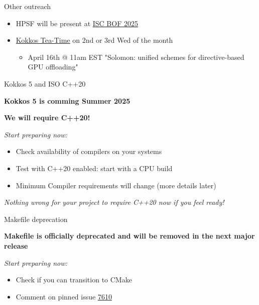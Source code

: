 \begin{frame}[fragile]{Other outreach}
  \begin{itemize}
    \item{HPSF will be present at \href{https://isc.app.swapcard.com/widget/event/isc-high-performance-2025/planning/UGxhbm5pbmdfMjU4NjE0MQ==}{ISC BOF 2025}}
\item{\href{https://kokkos.org/community/tea-time/}{Kokkos Tea-Time} on 2nd or 3rd Wed of the month} 
  \begin{itemize}
      \item April 16th @ 11am EST "Solomon: unified schemes for directive-based GPU offloading"
  \end{itemize}
\end{itemize}

\end{frame}


\begin{frame}[fragile]{Kokkos 5 and ISO C++20}
\begin{center}
\textbf{Kokkos 5 is comming Summer 2025}

\vspace{0.5cm}
\textbf{We will require C++20!}
\end{center}

\textit{Start preparing now:}
\begin{itemize}
  \item{Check availability of compilers on your systems}
  \item{Test with C++20 enabled: start with a CPU build}
  \item{Minimum Compiler requirements will change (more details later)}
\end{itemize}

\vspace{0.5cm}
\begin{center}
\textit{Nothing wrong for your project to require C++20 now if you feel ready!}
\end{center}
\end{frame}

\begin{frame}[fragile]{Makefile deprecation}
\begin{center}
\textbf{Makefile is officially deprecated and will be removed in the next major release}

\textit{Start preparing now:}
\begin{itemize}
  \item{Check if you can transition to CMake}
  \item{Comment on pinned issue \href{https://github.com/kokkos/kokkos/issues/7610}{7610}}
\end{itemize}
\end{center}

\end{frame}

